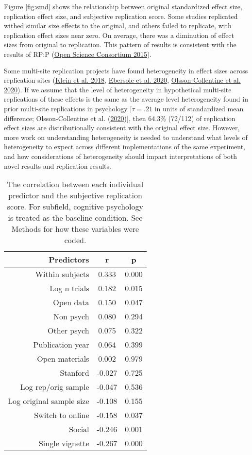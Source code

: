 \documentclass[
  english,
  a4paper,
]{article}
\begin{document}
Figure \ref{fig:smd} shows the relationship between original standardized effect size, replication effect size, and subjective replication score. Some studies replicated withed similar size effects to the original, and others failed to replicate, with replication effect sizes near zero. On average, there was a diminution of effect sizes from original to replication. This pattern of results is consistent with the results of RP:P (\protect\hyperlink{ref-openscienceconsortium2015}{Open Science Consortium 2015}).

Some multi-site replication projects have found heterogeneity in effect sizes across replication sites (\protect\hyperlink{ref-klein2018}{Klein et al. 2018}, \protect\hyperlink{ref-ebersole2020}{Ebersole et al. 2020}, \protect\hyperlink{ref-olsson2020}{Olsson-Collentine et al. 2020}). If we assume that the level of heterogeneity in hypothetical multi-site replications of these effects is the same as the average level heterogeneity found in prior multi-site replications in psychology {[}\(\tau=.21\) in units of standardized mean difference; Olsson-Collentine et al. (\protect\hyperlink{ref-olsson2020}{2020}){]}, then 64.3\% (72/112) of replication effect sizes are distributionally consistent with the original effect size. However, more work on understanding heterogeneity is needed to understand what levels of heterogeneity to expect across different implementations of the same experiment, and how considerations of heterogeneity should impact interpretations of both novel results and replication results.

\begin{table}[!h]

\caption{\label{tab:cor}The correlation between each individual predictor and the subjective replication score. For subfield, cognitive psychology is treated as the baseline condition. See Methods for how these variables were coded.}
\centering
\fontsize{10}{12}\selectfont
\begin{tabular}[t]{rcc}
\toprule
Predictors & r & p\\
\midrule
Within subjects & 0.333 & 0.000\\
Log n trials & 0.182 & 0.015\\
Open data & 0.150 & 0.047\\
Non psych & 0.080 & 0.294\\
Other psych & 0.075 & 0.322\\
\addlinespace
Publication year & 0.064 & 0.399\\
Open materials & 0.002 & 0.979\\
Stanford & -0.027 & 0.725\\
Log rep/orig sample & -0.047 & 0.536\\
Log original sample size & -0.108 & 0.155\\
\addlinespace
Switch to online & -0.158 & 0.037\\
Social & -0.246 & 0.001\\
Single vignette & -0.267 & 0.000\\
\bottomrule
\end{tabular}
\end{table}
\end{document}
